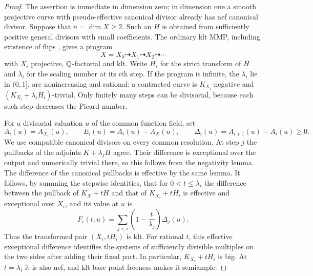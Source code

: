 \begin{proof}
The assertion is immediate in dimension zero; in dimension one a smooth
projective curve with pseudo-effective canonical divisor already has nef
canonical divisor.  Suppose that $n=\dim X\geq2$.  Such an $H$ is obtained
from sufficiently positive general divisors with small coefficients.  The
ordinary klt MMP, including existence of flips \cite{BCHM}, gives a program
\[
 X=X_0\dashrightarrow X_1\dashrightarrow X_2\dashrightarrow\cdots
\]
with $X_i$ projective, $\mathbb Q$-factorial and klt.  Write $H_i$ for the strict
transform of $H$ and $\lambda_i$ for the scaling number at its $i$th step.
If the program is infinite, the $\lambda_i$ lie in $(0,1]$, are
nonincreasing and rational: a contracted curve is $K_{X_i}$-negative and
$(K_{X_i}+\lambda_iH_i)$-trivial.  Only finitely many steps can be
divisorial, because each such step decreases the Picard number.

For a divisorial valuation $u$ of the common function field, set
\begin{equation}\label{glob:increments}
 A_i(u)=A_{X_i}(u),\qquad
 E_i(u)=A_i(u)-A_X(u),\qquad
 \Delta_i(u)=A_{i+1}(u)-A_i(u)\geq0.
\end{equation}
We use compatible canonical divisors on every common resolution.  At step
$j$ the pullbacks of the adjoints $K+\lambda_jH$ agree.  Their difference is
exceptional over the output and numerically trivial there, so this follows
from the negativity lemma.  The difference of the canonical pullbacks is
effective by the same lemma.  It follows, by summing the stepwise
identities, that for $0<t\leq\lambda_i$ the difference between the pullback
of $K_X+tH$ and that of $K_{X_i}+tH_i$ is effective and exceptional over
$X_i$, and its value at $u$ is
\begin{equation}\label{glob:fixed-difference}
 F_i(t;u)=\sum_{j<i}\left(1-\frac{t}{\lambda_j}\right)\Delta_j(u).
\end{equation}
Thus the transformed pair $(X_i,tH_i)$ is klt.  For rational $t$, this
effective exceptional difference identifies the systems of sufficiently
divisible multiples on the two sides after adding their fixed part.
In particular, $K_{X_i}+tH_i$ is big.  At $t=\lambda_i$ it is also nef,
and klt base point freeness makes it semiample.


\end{proof}
